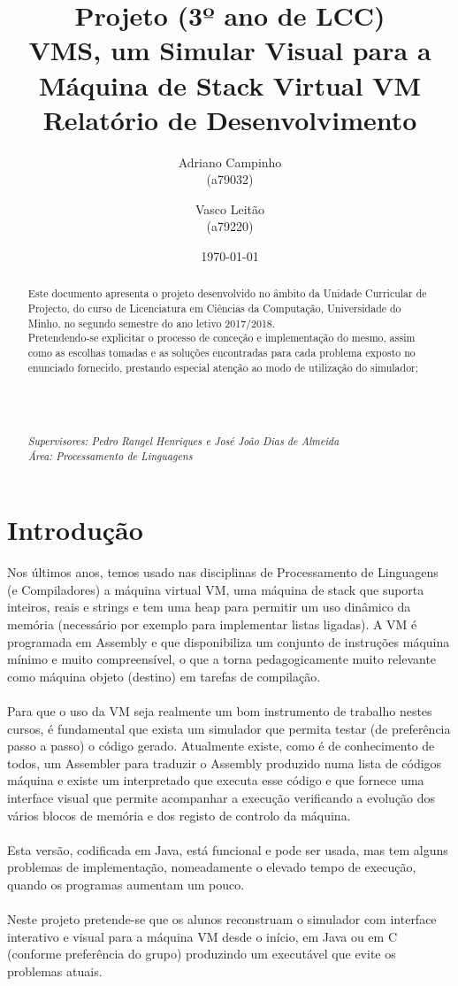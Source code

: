 \documentclass{report}
\title{Projeto (3º ano de LCC)\\ \textbf{VMS, um Simular Visual para a Máquina de Stack Virtual VM}\\ Relatório de Desenvolvimento}
\author{Adriano Campinho\\ (a79032) \and Vasco Leitão\\ (a79220) }
\date{\today}
\def\supers#1{{\em Supervisores: #1}\\ }
\def\area#1{{\em \'{A}rea: #1}\\[0.2cm]}
\begin{document}
\maketitle
\begin{abstract}
	\quad Este documento apresenta o projeto desenvolvido no âmbito da Unidade Curricular de Projecto, do curso de
	Licenciatura em Ciências da Computação, Universidade do Minho, no segundo semestre do ano letivo 2017/2018.\\
	\quad Pretendendo-se explicitar o processo de conceção e implementação do mesmo, assim como as escolhas tomadas e as soluções encontradas
	para cada problema exposto no enunciado fornecido, prestando especial atenção ao modo de utilização do simulador; \\
	\\
	\\
	\\
    \\
	\supers{Pedro Rangel Henriques e José João Dias de Almeida}
	\area{Processamento de Linguagens}

\end{abstract}

\tableofcontents

\chapter{Introdução} \label{intro}

\quad Nos últimos anos, temos usado nas disciplinas de Processamento de Linguagens (e
Compiladores) a máquina virtual VM, uma máquina de stack que suporta inteiros, reais e
strings e tem uma heap para permitir um uso dinâmico da memória (necessário por exemplo
para implementar listas ligadas). A VM é programada em Assembly e que disponibiliza um
conjunto de instruções máquina mínimo e muito compreensível, o que a torna
pedagogicamente muito relevante como máquina objeto (destino) em tarefas de compilação.
\\
\\
\null\quad Para que o uso da VM seja realmente um bom instrumento de trabalho nestes cursos, é
fundamental que exista um simulador que permita testar (de preferência passo a passo) o
código gerado. Atualmente existe, como é de conhecimento de todos, um Assembler para
traduzir o Assembly produzido numa lista de códigos máquina e existe um interpretado que
executa esse código e que fornece uma interface visual que permite acompanhar a execução
verificando a evolução dos vários blocos de memória e dos registo de controlo da máquina.
\\
\\
\null\quad Esta versão, codificada em Java, está funcional e pode ser usada, mas tem alguns problemas de
implementação, nomeadamente o elevado tempo de execução, quando os programas
aumentam um pouco.
\\
\\
\null\quad Neste projeto pretende-se que os alunos reconstruam o simulador com interface interativo e
visual para a máquina VM desde o início, em Java ou em C (conforme preferência do grupo)
produzindo um executável que evite os problemas atuais.
\end{document}

